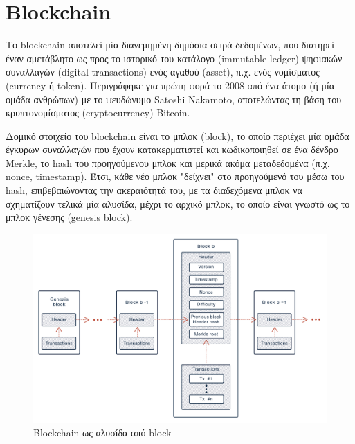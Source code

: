 \section{Blockchain} \label{section:2-5-blockchain}

Το blockchain αποτελεί μία διανεμημένη δημόσια σειρά δεδομένων, που διατηρεί έναν αμετάβλητο ως προς το ιστορικό του κατάλογο (immutable ledger) ψηφιακών συναλλαγών (digital transactions) ενός αγαθού (asset), π.χ. ενός νομίσματος (currency ή token). Περιγράφηκε για πρώτη φορά το 2008 από ένα άτομο (ή μία ομάδα ανθρώπων) με το ψευδώνυμο Satoshi Nakamoto, αποτελώντας τη βάση του κρυπτονομίσματος (cryptocurrency) Bitcoin.\cite{2.5-bitcoin}

Δομικό στοιχείο του blockchain είναι το μπλοκ (block), το οποίο περιέχει μία ομάδα έγκυρων συναλλαγών που έχουν κατακερματιστεί και κωδικοποιηθεί σε ένα δένδρο Merkle, το hash του προηγούμενου μπλοκ και μερικά ακόμα μεταδεδομένα (π.χ. nonce, timestamp). Έτσι, κάθε νέο μπλοκ "δείχνει" στο προηγούμενό του μέσω του hash, επιβεβαιώνοντας την ακεραιότητά του, με τα διαδεχόμενα μπλοκ να σχηματίζουν τελικά μία αλυσίδα, μέχρι το αρχικό μπλοκ, το οποίο είναι γνωστό ως το μπλοκ γένεσης (genesis block).\cite{2.5-blockchain}

\begin{figure}[H]
	\centering
	\includegraphics[width=.95\textwidth]{assets/figures/chapter-2/2.3.blockchain}
	\caption{Blockchain ως αλυσίδα από block}
\end{figure}

